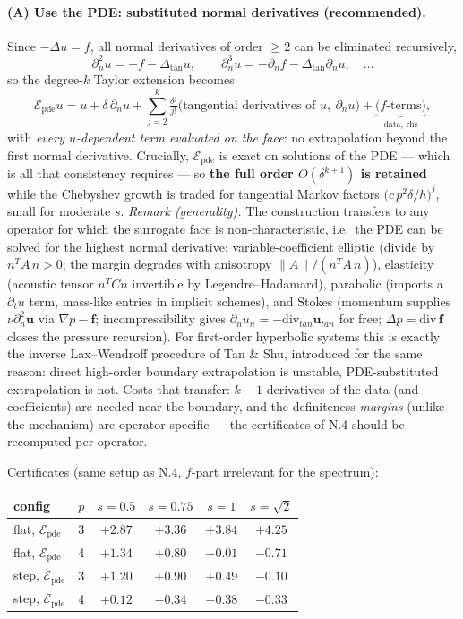 \paragraph{(A) Use the PDE: substituted normal derivatives (recommended).}
Since $-\Delta u = f$, all normal derivatives of order $\ge 2$ can be
eliminated recursively,
\[
  \partial_n^2 u = -f - \Delta_{\mathrm{tan}} u, \qquad
  \partial_n^3 u = -\partial_n f - \Delta_{\mathrm{tan}} \partial_n u,
  \quad \dots
\]
so the degree-$k$ Taylor extension becomes
\[
  \mathcal E_{\mathrm{pde}} u
  = u + \delta\, \partial_n u
  + \sum_{j=2}^{k} \tfrac{\delta^j}{j!}
    \big( \text{tangential derivatives of } u,\ \partial_n u \big)
  + \underbrace{\big( f\text{-terms} \big)}_{\text{data, rhs}} ,
\]
with \emph{every $u$-dependent term evaluated on the face}: no
extrapolation beyond the first normal derivative. Crucially,
$\mathcal E_{\mathrm{pde}}$ is exact on solutions of the PDE --- which is
all that consistency requires --- so \textbf{the full order $O(\delta^{k+1})$
is retained} while the Chebyshev growth is traded for tangential Markov
factors $\big(c\,p^2 \delta/h\big)^{j}$, small for moderate $s$.
\emph{Remark (generality).} The construction transfers to any operator for
which the surrogate face is non-characteristic, i.e.\ the PDE can be solved
for the highest normal derivative: variable-coefficient elliptic (divide by
$n^T\!A\,n > 0$; the margin degrades with anisotropy $\|A\|/(n^T\!A\,n)$),
elasticity (acoustic tensor $n^T C n$ invertible by Legendre--Hadamard),
parabolic (imports a $\partial_t u$ term, mass-like entries in implicit
schemes), and Stokes (momentum supplies $\nu\partial_n^2\mathbf u$ via
$\nabla p - \mathbf f$; incompressibility gives $\partial_n u_n =
-\mathrm{div}_{tan}\mathbf u_{tan}$ for free; $\Delta p = \mathrm{div}\,
\mathbf f$ closes the pressure recursion). For first-order hyperbolic
systems this is exactly the inverse Lax--Wendroff procedure of Tan \& Shu,
introduced for the same reason: direct high-order boundary extrapolation is
unstable, PDE-substituted extrapolation is not. Costs that transfer:
$k-1$ derivatives of the data (and coefficients) are needed near the
boundary, and the definiteness \emph{margins} (unlike the mechanism) are
operator-specific --- the certificates of N.4 should be recomputed per
operator.

Certificates (same setup as N.4, $f$-part irrelevant for the spectrum):

\begin{center}
\begin{tabular}{llcccc}
\hline
config & $p$ & $s=0.5$ & $s=0.75$ & $s=1$ & $s=\sqrt2$ \\
\hline
flat, $\mathcal E_{\mathrm{pde}}$ & 3 & $+2.87$ & $+3.36$ & $+3.84$ & $+4.25$ \\
flat, $\mathcal E_{\mathrm{pde}}$ & 4 & $+1.34$ & $+0.80$ & $-0.01$ & $-0.71$ \\
step, $\mathcal E_{\mathrm{pde}}$ & 3 & $+1.20$ & $+0.90$ & $+0.49$ & $-0.10$ \\
step, $\mathcal E_{\mathrm{pde}}$ & 4 & $+0.12$ & $-0.34$ & $-0.38$ & $-0.33$ \\
\hline
\end{tabular}
\end{center}

